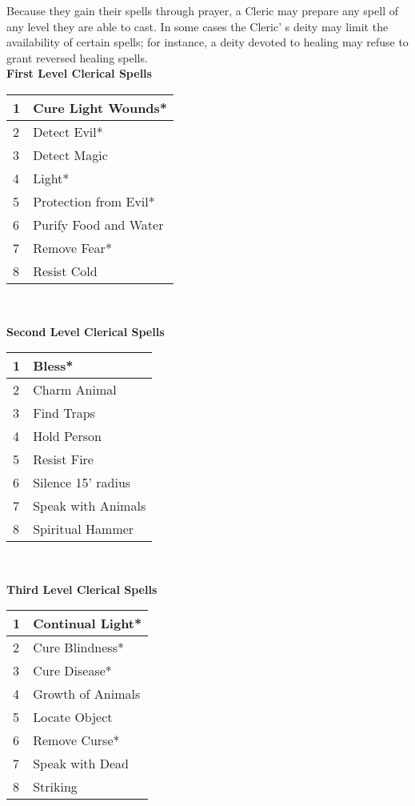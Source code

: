 \documentclass[a4paper,twoside,openany,10pt]{book}
\begin{document}
\begin{multicols}{2}
Because they gain their spells through prayer, a Cleric may prepare any spell of any level they are able to cast. In some cases the Cleric' s deity may limit the availability of certain spells; for instance, a deity devoted to healing may refuse to grant reversed healing spells.\\

{\large \textbf{First Level Clerical Spells}}

\begin{tabularx}{0.45\textwidth}{@{}ll@{}}
1 & Cure Light Wounds* \\\toprule
2 & Detect Evil* \\\hline
3 & Detect Magic \\\hline
4 & Light* \\\hline
5 & Protection from Evil* \\\hline
6 & Purify Food and Water \\\hline
7 & Remove Fear* \\\hline
8 & Resist Cold \\\bottomrule
\end{tabularx}\\\bigskip

{\large \textbf{Second Level Clerical Spells}}

\begin{tabularx}{0.45\textwidth}{@{}ll@{}}
1 & Bless* \\\toprule
2 & Charm Animal \\\hline
3 & Find Traps \\\hline
4 & Hold Person \\\hline
5 & Resist Fire \\\hline
6 & Silence 15'{} radius \\\hline
7 & Speak with Animals \\\hline
8 & Spiritual Hammer \\\bottomrule
\end{tabularx}\\\bigskip

{\large \textbf{Third Level Clerical Spells}}

\begin{tabularx}{0.45\textwidth}{@{}ll@{}}
1 & Continual Light* \\\toprule
2 & Cure Blindness* \\\hline
3 & Cure Disease* \\\hline
4 & Growth of Animals \\\hline
5 & Locate Object \\\hline
6 & Remove Curse* \\\hline
7 & Speak with Dead \\\hline
8 & Striking \\\bottomrule
\end{tabularx}\\\bigskip


\end{multicols}
\end{document}
